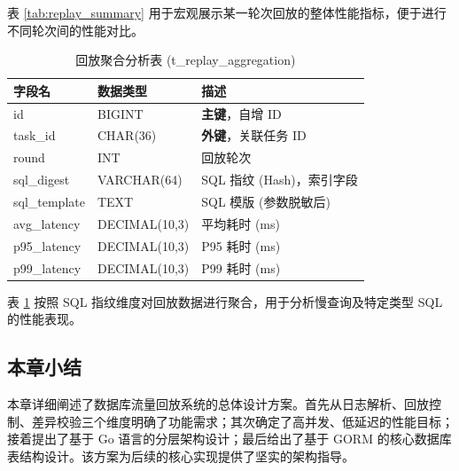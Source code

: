 表 \ref{tab:replay_summary} 用于宏观展示某一轮次回放的整体性能指标，便于进行不同轮次间的性能对比。

\begin{table}[htbp]
    \centering
    \caption{回放聚合分析表 (t\_replay\_aggregation)}
    \label{tab:replay_aggregation}
    \begin{tabular}{l l p{6cm}}
        \toprule
        \textbf{字段名} & \textbf{数据类型} & \textbf{描述} \\
        \midrule
        id & BIGINT & \textbf{主键}，自增 ID \\
        task\_id & CHAR(36) & \textbf{外键}，关联任务 ID \\
        round & INT & 回放轮次 \\
        sql\_digest & VARCHAR(64) & SQL 指纹 (Hash)，索引字段 \\
        sql\_template & TEXT & SQL 模版 (参数脱敏后) \\
        avg\_latency & DECIMAL(10,3) & 平均耗时 (ms) \\
        p95\_latency & DECIMAL(10,3) & P95 耗时 (ms) \\
        p99\_latency & DECIMAL(10,3) & P99 耗时 (ms) \\
        \bottomrule
    \end{tabular}
\end{table}

表 \ref{tab:replay_aggregation} 按照 SQL 指纹维度对回放数据进行聚合，用于分析慢查询及特定类型 SQL 的性能表现。
\subsection{本章小结}

本章详细阐述了数据库流量回放系统的总体设计方案。首先从日志解析、回放控制、差异校验三个维度明确了功能需求；其次确定了高并发、低延迟的性能目标；接着提出了基于 Go 语言的分层架构设计；最后给出了基于 GORM 的核心数据库表结构设计。该方案为后续的核心实现提供了坚实的架构指导。